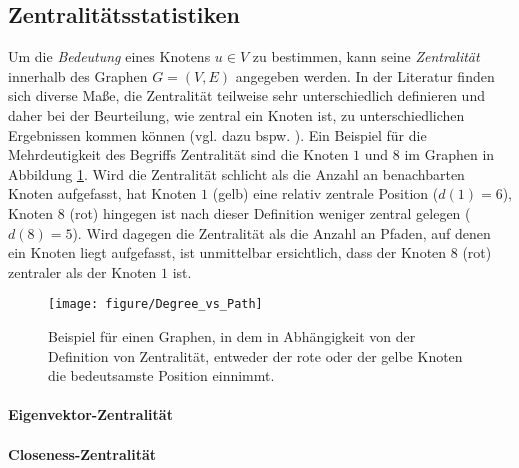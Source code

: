 \documentclass[12pt, a4paper]{report}\usepackage[]{graphicx}\usepackage[]{color}
\newenvironment{knitrout}{}{} %
\begin{document}
\subsection{Zentralitätsstatistiken}\label{Kap_Zentralitätsstatistiken}
Um die \textit{Bedeutung} eines Knotens $u \in V$ zu bestimmen, kann seine \textit{Zentralität} innerhalb des Graphen $G=(V,E)$ angegeben werden. In der Literatur finden sich diverse Maße, die Zentralität teilweise sehr unterschiedlich definieren und daher bei der Beurteilung, wie zentral ein Knoten ist, zu unterschiedlichen Ergebnissen kommen können (vgl. dazu bspw. ). Ein Beispiel für die Mehrdeutigkeit des Begriffs Zentralität sind die Knoten $1$ und $8$ im Graphen in Abbildung \ref{fig:Degree_vs_Path}. Wird die Zentralität schlicht als die Anzahl an benachbarten Knoten aufgefasst, hat Knoten $1$ (gelb) eine relativ zentrale Position ($d(1)=6$), Knoten $8$ (rot) hingegen ist nach dieser Definition weniger zentral gelegen ($d(8)=5$). Wird dagegen die Zentralität als die Anzahl an Pfaden, auf denen ein Knoten liegt aufgefasst, ist unmittelbar ersichtlich, dass der Knoten $8$ (rot) zentraler als der Knoten $1$ ist.\\




\begin{knitrout}
\color{fgcolor}\begin{figure}[H]


{\centering \texttt{[image: figure/Degree\_vs\_Path]} 

}

\caption[Beispiel für einen Graphen, in dem in Abhängigkeit von der Definition von Zentralität, entweder der rote oder der gelbe Knoten die bedeutsamste Position einnimmt]{Beispiel für einen Graphen, in dem in Abhängigkeit von der Definition von Zentralität, entweder der rote oder der gelbe Knoten die bedeutsamste Position einnimmt.\label{fig:Degree_vs_Path}}
\end{figure}


\end{knitrout}


\paragraph*{Eigenvektor-Zentralität}\label{Kap_Eigenvektor-Zentralität}
\paragraph*{Closeness-Zentralität}\label{Kap_Closeness-Zentralität}
\end{document}
